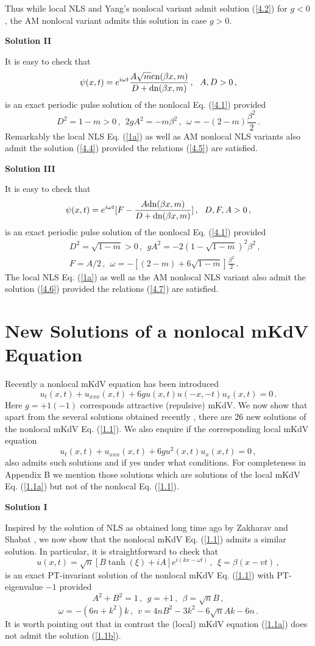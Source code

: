 \documentclass[11pt]{article}
\newcommand{\be}{\begin{equation}}
\newcommand{\ee}{\end{equation}}
\newcommand{\bea}{\begin{eqnarray}}
\newcommand{\eea}{\end{eqnarray}}
\newcommand{\dn}{{\rm dn}}
\newcommand{\cn}{{\rm cn}}
\begin{document}
Thus while local NLS and Yang's nonlocal variant admit solution (\ref{4.2})
for $g < 0$, the AM nonlocal variant admits this solution in case $g > 0$.

{\bf Solution II}

It is easy to check that 
\be\label{4.4}
\psi(x,t) = e^{i\omega t} \frac{A\sqrt{m}\cn(\beta x,m)}{D+\dn(\beta x,m)}\,,
~~A, D > 0\,,
\ee
is an exact periodic pulse solution of the nonlocal Eq. (\ref{4.1}) provided
\be\label{4.5}
D^2 = 1-m > 0\,,~~2 g A^2 = -m \beta^2\,,~~\omega = -(2-m)\frac{\beta^2}{2}\,.
\ee
Remarkably the local NLS Eq. (\ref{1a}) as well as AM nonlocal NLS 
variants also admit the solution (\ref{4.4}) provided the relations 
(\ref{4.5}) are satisfied.


{\bf Solution III}

It is easy to check that 
\be\label{4.6}
\psi(x,t) = e^{i\omega t} [F-\frac{A\dn(\beta x,m)}{D+\dn(\beta x,m)}]\,,
~~D,F,A > 0\,,
\ee
is an exact periodic pulse solution of the nonlocal Eq. (\ref{4.1}) provided
\bea\label{4.7}
&&D^2 = \sqrt{1-m} > 0\,,~~ g A^2 = -2(1-\sqrt{1-m})^2 \beta^2\,,
\nonumber \\
&&F = A/2\,,~~\omega = -[(2-m)+6\sqrt{1-m}]\frac{\beta^2}{2}\,.
\eea
The local NLS Eq. (\ref{1a}) as well as the AM nonlocal NLS 
variant also admit the solution (\ref{4.6})
provided the relations (\ref{4.7}) are satisfied.

\section{New Solutions of a nonlocal mKdV Equation}

Recently a nonlocal mKdV equation has been introduced \cite{mkdv}
\be\label{1.1}
u_t(x,t) +u_{xxx}(x,t)+6g u(x,t) u(-x,-t) u_x(x,t) = 0\,.
\ee
Here $g = +1(-1)$ corresponds attractive (repulsive) mKdV.
We now show that apart from the several solutions obtained recently 
\cite{ks2}, there are 26 new solutions of the nonlocal mKdV
Eq. (\ref{1.1}). We also enquire if the corresponding local mKdV 
equation
\be\label{1.1a}
u_t(x,t) +u_{xxx}(x,t)+6g u^2(x,t) u_x(x,t) = 0\,,
\ee
also admits such solutions and if yes under what conditions. For
completeness in Appendix B we mention those solutions which are 
solutions of the local mKdV Eq. (\ref{1.1a}) but not of the nonlocal
Eq. (\ref{1.1}). 


{\bf Solution I}

Inspired by the solution of NLS as obtained long time ago by Zakharav
and Shabat \cite{zs}, we now show that the nonlocal mKdV Eq. (\ref{1.1})
admits a similar solution. In particular, it is straightforward to
check that
\be\label{1.1b}
u(x,t) = \sqrt{n}[B\tanh(\xi)+iA]e^{i(kx-\omega t)}\,,~~\xi = 
\beta(x-vt)\,,
\ee
is an exact PT-invariant solution of the nonlocal mKdV Eq. (\ref{1.1}) 
with PT-eigenvalue $-1$ provided
\be\label{1.1c}
A^2+B^2 = 1\,,~~g = +1\,,~~\beta = \sqrt{n} B\,,
\ee
\be\label{1.1d}
\omega = -(6n+k^2)k\,,~~v = 4nB^2-3k^2-6\sqrt{n} Ak-6n\,.
\ee
It is worth pointing out that in contrast the (local) mKdV equation
(\ref{1.1a}) does not admit the solution  (\ref{1.1b}).
\end{document}
